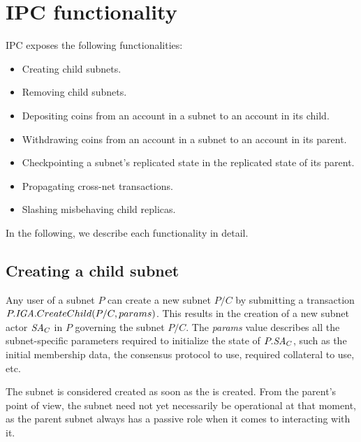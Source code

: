 \section{IPC functionality}
\label{sec:functionality}

IPC exposes the following functionalities:
\begin{itemize}
    \item Creating child subnets.
    \item Removing child subnets.
    \item Depositing coins from an account in a subnet to an account in its child.
    \item Withdrawing coins from an account in a subnet to an account in its parent.
    \item Checkpointing a subnet's replicated state in the replicated state of its parent.
    \item Propagating cross-net transactions.
    \item Slashing misbehaving child replicas.
\end{itemize}
In the following, we describe each functionality in detail.

\subsection{Creating a child subnet}
\label{sec:create}

Any user of a subnet $P$ can create a new subnet $P/C$ by submitting a transaction $P.\textit{IGA}.CreateChild(P/C, params)$.
This results in the creation of a new subnet actor $\textit{SA}_C$ in $P$ governing the subnet $P/C$.
The \emph{params} value describes all the subnet-specific parameters required to initialize the state of $P.\textit{SA}_C$,
such as the initial membership data, the consensus protocol to use, required collateral to use, etc.

The subnet is considered created as soon as the \sa is created.
From the parent's point of view, the subnet need not yet necessarily be operational at that moment,
as the parent subnet always has a passive role when it comes to interacting with it.

